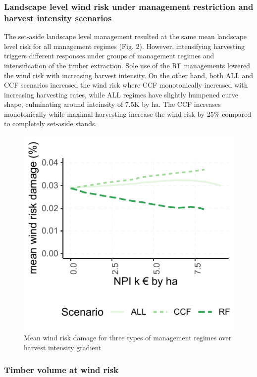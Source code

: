 \documentclass[]{elsarticle} %
\makeatletter
\def\maxwidth{\ifdim\Gin@nat@width>\linewidth\linewidth
\else\Gin@nat@width\fi}
\let\Oldincludegraphics\includegraphics
\renewcommand{\includegraphics}[1]{\Oldincludegraphics[width=\maxwidth]{#1}}
\makeatother
\begin{document}
\subsubsection{Landscape level wind risk under management restriction
and harvest intensity
scenarios}\label{landscape-level-wind-risk-under-management-restriction-and-harvest-intensity-scenarios}

The set-aside landscape level management resulted at the same mean
landscape level risk for all management regimes (Fig. 2). However,
intensifying harvesting triggers different responses under groups of
management regimes and intensification of the timber extraction. Sole
use of the RF managements lowered the wind risk with increasing harvest
intensity. On the other hand, both ALL and CCF scenarios increased the
wind risk where CCF monotonically increased with increasing harvesting
rates, while ALL regimes have slightly humpened curve shape, culminating
around inteinsity of 7.5K by ha. The CCF increases monotonically while
maximal harvesting increase the wind risk by 25\% compared to completely
set-aside stands.

\begin{figure}
\centering
\includegraphics{test_manus_files/figure-latex/fig3_mean_risk_by_intensity_plot-1.pdf}
\caption{Mean wind risk damage for three types of management regimes
over harvest intensity gradient}
\end{figure}

\subsubsection{Timber volume at wind
risk}\label{timber-volume-at-wind-risk}
\end{document}
